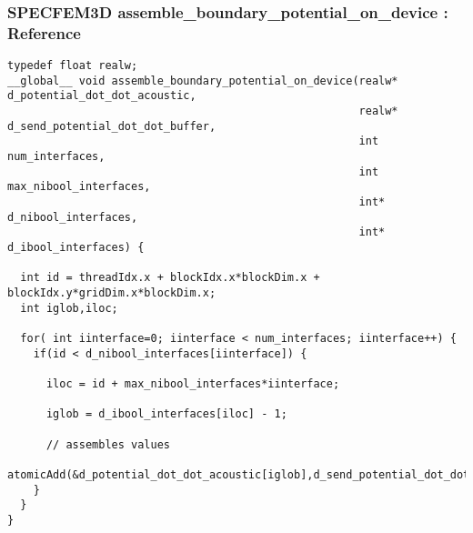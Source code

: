 \documentclass{beamer}
\begin{document}
\begin{frame}[fragile]
\frametitle{SPECFEM3D assemble\_boundary\_potential\_on\_device : Reference}
\tiny
{}
\begin{lstlisting}
typedef float realw;
__global__ void assemble_boundary_potential_on_device(realw* d_potential_dot_dot_acoustic,
                                                      realw* d_send_potential_dot_dot_buffer,
                                                      int num_interfaces,
                                                      int max_nibool_interfaces,
                                                      int* d_nibool_interfaces,
                                                      int* d_ibool_interfaces) {

  int id = threadIdx.x + blockIdx.x*blockDim.x + blockIdx.y*gridDim.x*blockDim.x;
  int iglob,iloc;

  for( int iinterface=0; iinterface < num_interfaces; iinterface++) {
    if(id < d_nibool_interfaces[iinterface]) {

      iloc = id + max_nibool_interfaces*iinterface;

      iglob = d_ibool_interfaces[iloc] - 1;

      // assembles values
      atomicAdd(&d_potential_dot_dot_acoustic[iglob],d_send_potential_dot_dot_buffer[iloc]);
    }
  }
}
\end{lstlisting}

\end{frame}
\end{document}
